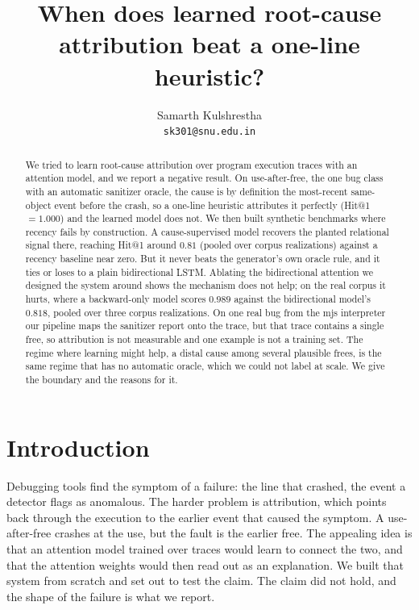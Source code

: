 \documentclass[11pt]{article}
\title{When does learned root-cause attribution beat a one-line heuristic?}
\author{Samarth Kulshrestha\\ \small\texttt{sk301@snu.edu.in}}
\date{}
\begin{document}
\maketitle

\begin{abstract}
We tried to learn root-cause attribution over program execution traces with an attention model, and we report a negative result. On use-after-free, the one bug class with an automatic sanitizer oracle, the cause is by definition the most-recent same-object event before the crash, so a one-line heuristic attributes it perfectly (Hit@1 $= 1.000$) and the learned model does not. We then built synthetic benchmarks where recency fails by construction. A cause-supervised model recovers the planted relational signal there, reaching Hit@1 around $0.81$ (pooled over corpus realizations) against a recency baseline near zero. But it never beats the generator's own oracle rule, and it ties or loses to a plain bidirectional LSTM. Ablating the bidirectional attention we designed the system around shows the mechanism does not help; on the real corpus it hurts, where a backward-only model scores $0.989$ against the bidirectional model's $0.818$, pooled over three corpus realizations. On one real bug from the mjs interpreter our pipeline maps the sanitizer report onto the trace, but that trace contains a single free, so attribution is not measurable and one example is not a training set. The regime where learning might help, a distal cause among several plausible frees, is the same regime that has no automatic oracle, which we could not label at scale. We give the boundary and the reasons for it.
\end{abstract}

\section{Introduction}

Debugging tools find the symptom of a failure: the line that crashed, the event a detector flags as anomalous. The harder problem is attribution, which points back through the execution to the earlier event that caused the symptom. A use-after-free crashes at the use, but the fault is the earlier free. The appealing idea is that an attention model trained over traces would learn to connect the two, and that the attention weights would then read out as an explanation. We built that system from scratch and set out to test the claim. The claim did not hold, and the shape of the failure is what we report.
\end{document}
